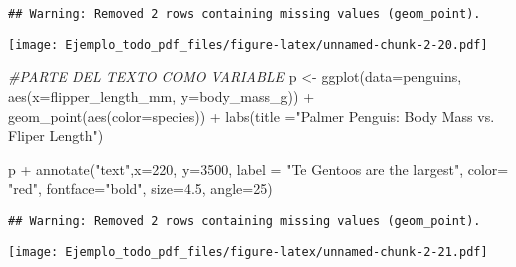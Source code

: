 \documentclass[
]{article}
\newenvironment{Shaded}{\begin{snugshade}}{\end{snugshade}}
\newcommand{\AttributeTok}[1]{\textcolor[rgb]{0.77,0.63,0.00}{#1}}
\newcommand{\CommentTok}[1]{\textcolor[rgb]{0.56,0.35,0.01}{\textit{#1}}}
\newcommand{\DecValTok}[1]{\textcolor[rgb]{0.00,0.00,0.81}{#1}}
\newcommand{\FloatTok}[1]{\textcolor[rgb]{0.00,0.00,0.81}{#1}}
\newcommand{\FunctionTok}[1]{\textcolor[rgb]{0.00,0.00,0.00}{#1}}
\newcommand{\NormalTok}[1]{#1}
\newcommand{\OtherTok}[1]{\textcolor[rgb]{0.56,0.35,0.01}{#1}}
\newcommand{\SpecialCharTok}[1]{\textcolor[rgb]{0.00,0.00,0.00}{#1}}
\newcommand{\StringTok}[1]{\textcolor[rgb]{0.31,0.60,0.02}{#1}}
\begin{document}
\begin{verbatim}
## Warning: Removed 2 rows containing missing values (geom_point).
\end{verbatim}

\texttt{[image: Ejemplo\_todo\_pdf\_files/figure-latex/unnamed-chunk-2-20.pdf]}

\begin{Shaded}
\begin{Highlighting}[]
\CommentTok{\#PARTE DEL TEXTO COMO VARIABLE}
\NormalTok{p }\OtherTok{\textless{}{-}} \FunctionTok{ggplot}\NormalTok{(}\AttributeTok{data=}\NormalTok{penguins, }\FunctionTok{aes}\NormalTok{(}\AttributeTok{x=}\NormalTok{flipper\_length\_mm, }\AttributeTok{y=}\NormalTok{body\_mass\_g)) }\SpecialCharTok{+}
  \FunctionTok{geom\_point}\NormalTok{(}\FunctionTok{aes}\NormalTok{(}\AttributeTok{color=}\NormalTok{species)) }\SpecialCharTok{+}
  \FunctionTok{labs}\NormalTok{(}\AttributeTok{title =}\StringTok{"Palmer Penguis: Body Mass vs. Fliper Length"}\NormalTok{)}


\NormalTok{p }\SpecialCharTok{+} \FunctionTok{annotate}\NormalTok{(}\StringTok{"text"}\NormalTok{,}\AttributeTok{x=}\DecValTok{220}\NormalTok{, }\AttributeTok{y=}\DecValTok{3500}\NormalTok{, }\AttributeTok{label =} \StringTok{"Te Gentoos are the largest"}\NormalTok{, }\AttributeTok{color=} \StringTok{"red"}\NormalTok{, }\AttributeTok{fontface=}\StringTok{"bold"}\NormalTok{, }\AttributeTok{size=}\FloatTok{4.5}\NormalTok{, }\AttributeTok{angle=}\DecValTok{25}\NormalTok{)}
\end{Highlighting}
\end{Shaded}

\begin{verbatim}
## Warning: Removed 2 rows containing missing values (geom_point).
\end{verbatim}

\texttt{[image: Ejemplo\_todo\_pdf\_files/figure-latex/unnamed-chunk-2-21.pdf]}
\end{document}
